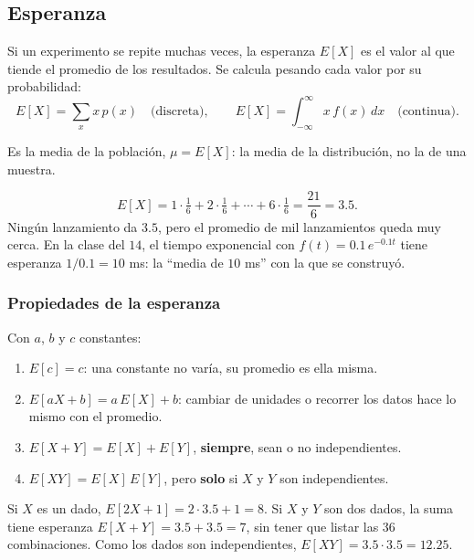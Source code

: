 \documentclass[11pt,letterpaper]{article}
\begin{document}

\subsection*{Esperanza}

\begin{definicion}[Esperanza]
    Si un experimento se repite muchas veces, la esperanza $E[X]$ es
    el valor al que tiende el promedio de los resultados. Se calcula
    pesando cada valor por su probabilidad:
    \[
        E[X] = \sum_{x} x\, p(x) \quad \text{(discreta)} ,
        \qquad
        E[X] = \int_{-\infty}^{\infty} x\, f(x)\, dx
        \quad \text{(continua)} .
    \]
\end{definicion}

Es la media de la población, $\mu = E[X]$: la media de la distribución,
no la de una muestra.

\begin{ejemplo}[Un dado]
    \[
        E[X] = 1 \cdot \tfrac{1}{6} + 2 \cdot \tfrac{1}{6} + \cdots
             + 6 \cdot \tfrac{1}{6} = \frac{21}{6} = 3.5 .
    \]
    Ningún lanzamiento da $3.5$, pero el promedio de mil lanzamientos
    queda muy cerca. En la clase del $14$, el tiempo exponencial con
    $f(t) = 0.1\, e^{-0.1 t}$ tiene esperanza $1/0.1 = 10$ ms: la
    ``media de $10$ ms'' con la que se construyó.
\end{ejemplo}

\subsubsection*{Propiedades de la esperanza}

Con $a$, $b$ y $c$ constantes:

\begin{enumerate}[itemsep=0.3em]
    \item $E[c] = c$: una constante no varía, su promedio es ella
          misma.
    \item $E[aX + b] = a\, E[X] + b$: cambiar de unidades o recorrer
          los datos hace lo mismo con el promedio.
    \item $E[X + Y] = E[X] + E[Y]$, \textbf{siempre}, sean o no
          independientes.
    \item $E[XY] = E[X]\, E[Y]$, pero \textbf{solo} si $X$ y $Y$ son
          independientes.
\end{enumerate}

\begin{ejemplo}
    Si $X$ es un dado, $E[2X + 1] = 2 \cdot 3.5 + 1 = 8$. Si $X$ y $Y$
    son dos dados, la suma tiene esperanza
    $E[X + Y] = 3.5 + 3.5 = 7$, sin tener que listar las $36$
    combinaciones. Como los dados son independientes,
    $E[XY] = 3.5 \cdot 3.5 = 12.25$.
\end{ejemplo}
\end{document}
